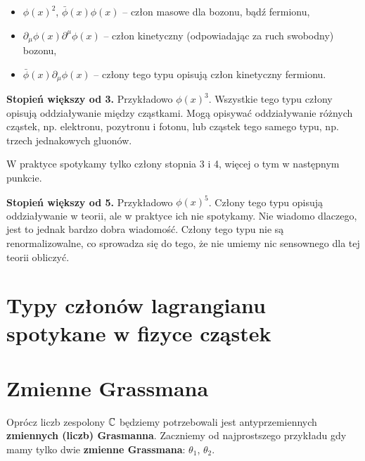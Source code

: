 \documentclass[a4paper,11pt]{article}
\begin{document}
\begin{itemize}
\item $\phi( x )^{ 2 }$, $\bar{\phi}( x ) \phi( x )$ -- człon masowe dla bozonu,
  bądź fermionu,

\item $\partial_{ \mu } \phi( x ) \partial^{ \mu } \phi( x )$ -- człon kinetyczny (odpowiadając
  za ruch swobodny) bozonu,

\item $\bar{\phi}( x ) \partial_{ \mu } \phi( x )$ -- człony tego typu opisują człon
  kinetyczny fermionu.
\end{itemize}

\textbf{Stopień większy od 3.} Przykładowo $\phi( x )^{ 3 }$. Wszystkie
tego typu człony opisują oddziaływanie między cząstkami. Mogą opisywać
oddziaływanie różnych cząstek, np. elektronu, pozytronu i fotonu, lub
cząstek tego samego typu, np. trzech jednakowych gluonów.

W praktyce spotykamy tylko człony stopnia 3 i 4, więcej o tym w
następnym punkcie.

\textbf{Stopień większy od 5.} Przykładowo $\phi( x )^{ 5 }$. Człony tego
typu opisują oddziaływanie w teorii, ale w praktyce ich nie spotykamy.
Nie wiadomo dlaczego, jest to jednak bardzo dobra wiadomość. Człony
tego typu nie są renormalizowalne, co sprowadza się do tego, że nie
umiemy nic sensownego dla tej teorii obliczyć.










\section{Typy członów lagrangianu spotykane w fizyce cząstek}







\section{Zmienne Grassmana}


Oprócz liczb zespolony $\mathbb{C}$ będziemy potrzebowali jest antyprzemiennych \textbf{zmiennych (liczb) Grasmanna}. Zaczniemy od najprostszego przykładu gdy mamy tylko dwie \textbf{zmienne Grassmana}: $\theta_{ 1 }$, $\theta_{ 2 }$.
\end{document}
